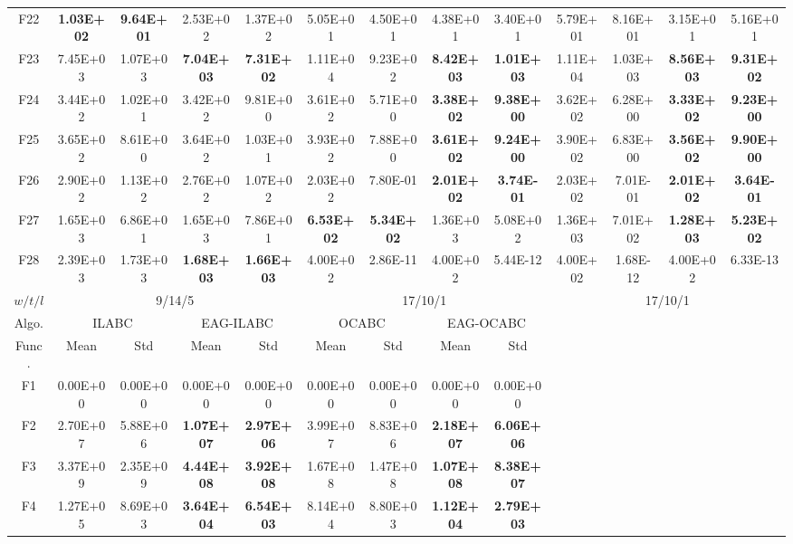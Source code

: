 \begin{table*}[!ht]
\begin{tabular}{|c|cc|cc|cc|cc|cc|cc|}
    F22   & \textbf{1.03E+02} & \textbf{9.64E+01} & 2.53E+02 & 1.37E+02 & 5.05E+01 & 4.50E+01 & 4.38E+01 & 3.40E+01 & 5.79E+01 & 8.16E+01 & 3.15E+01 & 5.16E+01 \\
    F23   & 7.45E+03 & 1.07E+03 & \textbf{7.04E+03} & \textbf{7.31E+02} & 1.11E+04 & 9.23E+02 & \textbf{8.42E+03} & \textbf{1.01E+03} & 1.11E+04 & 1.03E+03 & \textbf{8.56E+03} & \textbf{9.31E+02} \\
    F24   & 3.44E+02 & 1.02E+01 & 3.42E+02 & 9.81E+00 & 3.61E+02 & 5.71E+00 & \textbf{3.38E+02} & \textbf{9.38E+00} & 3.62E+02 & 6.28E+00 & \textbf{3.33E+02} & \textbf{9.23E+00} \\
    F25   & 3.65E+02 & 8.61E+00 & 3.64E+02 & 1.03E+01 & 3.93E+02 & 7.88E+00 & \textbf{3.61E+02} & \textbf{9.24E+00} & 3.90E+02 & 6.83E+00 & \textbf{3.56E+02} & \textbf{9.90E+00} \\
    F26   & 2.90E+02 & 1.13E+02 & 2.76E+02 & 1.07E+02 & 2.03E+02 & 7.80E-01 & \textbf{2.01E+02} & \textbf{3.74E-01} & 2.03E+02 & 7.01E-01 & \textbf{2.01E+02} & \textbf{3.64E-01} \\
    F27   & 1.65E+03 & 6.86E+01 & 1.65E+03 & 7.86E+01 & \textbf{6.53E+02} & \textbf{5.34E+02} & 1.36E+03 & 5.08E+02 & 1.36E+03 & 7.01E+02 & \textbf{1.28E+03} & \textbf{5.23E+02} \\
    F28   & 2.39E+03 & 1.73E+03 & \textbf{1.68E+03} & \textbf{1.66E+03} & 4.00E+02 & 2.86E-11 & 4.00E+02 & 5.44E-12 & 4.00E+02 & 1.68E-12 & 4.00E+02 & 6.33E-13 \\
    \hline
    $w/t/l$ & \multicolumn{4}{c|}{9/14/5}    & \multicolumn{4}{c|}{17/10/1}   & \multicolumn{4}{c|}{17/10/1} \\
    \hline
    \cline{1-9}
    Algo.   & \multicolumn{2}{c|}{ ILABC } & \multicolumn{2}{c|}{EAG-ILABC} & \multicolumn{2}{c|}{ OCABC } & \multicolumn{2}{c|}{EAG-OCABC}  \\ \cline{1-9}
    Func.   &  Mean  &  Std  & Mean  & Std   &  Mean  &  Std  & Mean  & Std   \\ \cline{1-9}
    F1    & 0.00E+00 & 0.00E+00 & 0.00E+00 & 0.00E+00 & 0.00E+00 & 0.00E+00 & 0.00E+00 & 0.00E+00 \\
    F2    & 2.70E+07 & 5.88E+06 & \textbf{1.07E+07} & \textbf{2.97E+06} & 3.99E+07 & 8.83E+06 & \textbf{2.18E+07} & \textbf{6.06E+06} \\
    F3    & 3.37E+09 & 2.35E+09 & \textbf{4.44E+08} & \textbf{3.92E+08} & 1.67E+08 & 1.47E+08 & \textbf{1.07E+08} & \textbf{8.38E+07} \\
    F4    & 1.27E+05 & 8.69E+03 & \textbf{3.64E+04} & \textbf{6.54E+03} & 8.14E+04 & 8.80E+03 & \textbf{1.12E+04} & \textbf{2.79E+03} \\

\end{tabular}
\end{table*}
